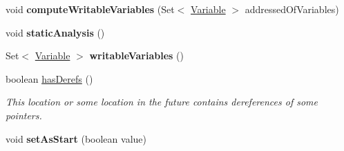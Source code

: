 \begin{DoxyCompactItemize}
\item 
\hypertarget{classedu_1_1udel_1_1cis_1_1vsl_1_1civl_1_1model_1_1common_1_1location_1_1CommonLocation_a10596db63c2f5de17a1076b264316b21}{}void {\bfseries compute\+Writable\+Variables} (Set$<$ \hyperlink{interfaceedu_1_1udel_1_1cis_1_1vsl_1_1civl_1_1model_1_1IF_1_1variable_1_1Variable}{Variable} $>$ addressed\+Of\+Variables)\label{classedu_1_1udel_1_1cis_1_1vsl_1_1civl_1_1model_1_1common_1_1location_1_1CommonLocation_a10596db63c2f5de17a1076b264316b21}

\item 
\hypertarget{classedu_1_1udel_1_1cis_1_1vsl_1_1civl_1_1model_1_1common_1_1location_1_1CommonLocation_a8b17cc7941f9ad20ffe63c084eae80e6}{}void {\bfseries static\+Analysis} ()\label{classedu_1_1udel_1_1cis_1_1vsl_1_1civl_1_1model_1_1common_1_1location_1_1CommonLocation_a8b17cc7941f9ad20ffe63c084eae80e6}

\item 
\hypertarget{classedu_1_1udel_1_1cis_1_1vsl_1_1civl_1_1model_1_1common_1_1location_1_1CommonLocation_a081112a703375b989de9558469eefd70}{}Set$<$ \hyperlink{interfaceedu_1_1udel_1_1cis_1_1vsl_1_1civl_1_1model_1_1IF_1_1variable_1_1Variable}{Variable} $>$ {\bfseries writable\+Variables} ()\label{classedu_1_1udel_1_1cis_1_1vsl_1_1civl_1_1model_1_1common_1_1location_1_1CommonLocation_a081112a703375b989de9558469eefd70}

\item 
boolean \hyperlink{classedu_1_1udel_1_1cis_1_1vsl_1_1civl_1_1model_1_1common_1_1location_1_1CommonLocation_a15a4555332ae10745f8ee13d9e7154d8}{has\+Derefs} ()
\begin{DoxyCompactList}\small\item\em This location or some location in the future contains dereferences of some pointers. \end{DoxyCompactList}\item 
\hypertarget{classedu_1_1udel_1_1cis_1_1vsl_1_1civl_1_1model_1_1common_1_1location_1_1CommonLocation_a97d18d406d4db74db635530344119703}{}void {\bfseries set\+As\+Start} (boolean value)\label{classedu_1_1udel_1_1cis_1_1vsl_1_1civl_1_1model_1_1common_1_1location_1_1CommonLocation_a97d18d406d4db74db635530344119703}


\end{DoxyCompactItemize}
